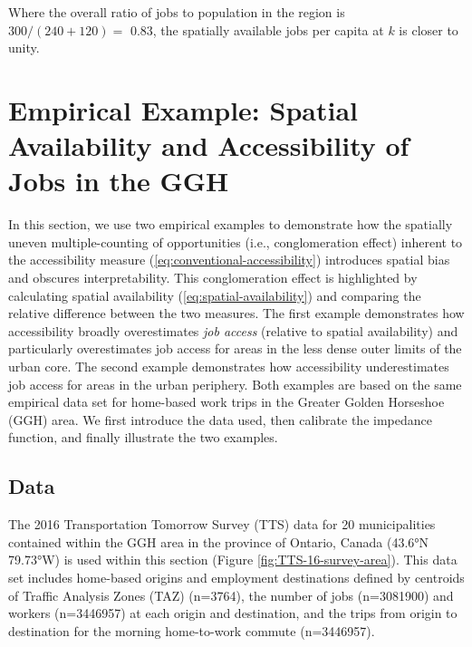 \documentclass[]{elsarticle} %
\begin{document}
Where the overall ratio of jobs to population in the region is
\(300/(240 + 120)=\) 0.83, the spatially available jobs per capita at
\(k\) is closer to unity.

\hypertarget{empirical-example-spatial-availability-and-accessibility-of-jobs-in-the-ggh}{%
\section{Empirical Example: Spatial Availability and Accessibility of
Jobs in the
GGH}\label{empirical-example-spatial-availability-and-accessibility-of-jobs-in-the-ggh}}

In this section, we use two empirical examples to demonstrate how the
spatially uneven multiple-counting of opportunities (i.e.,
conglomeration effect) inherent to the accessibility measure
(\ref{eq:conventional-accessibility}) introduces spatial bias and
obscures interpretability. This conglomeration effect is highlighted by
calculating spatial availability (\ref{eq:spatial-availability}) and
comparing the relative difference between the two measures. The first
example demonstrates how accessibility broadly overestimates \emph{job
access} (relative to spatial availability) and particularly
overestimates job access for areas in the less dense outer limits of the
urban core. The second example demonstrates how accessibility
underestimates job access for areas in the urban periphery. Both
examples are based on the same empirical data set for home-based work
trips in the Greater Golden Horseshoe (GGH) area. We first introduce the
data used, then calibrate the impedance function, and finally illustrate
the two examples.

\hypertarget{data}{%
\subsection{Data}\label{data}}

The 2016 Transportation Tomorrow Survey (TTS) data for 20 municipalities
contained within the GGH area in the province of Ontario, Canada (43.6°N
79.73°W) is used within this section (Figure
\ref{fig:TTS-16-survey-area}). This data set includes home-based origins
and employment destinations defined by centroids of Traffic Analysis
Zones (TAZ) (n=3764), the number of jobs (n=3081900) and workers
(n=3446957) at each origin and destination, and the trips from origin to
destination for the morning home-to-work commute (n=3446957).
\end{document}
